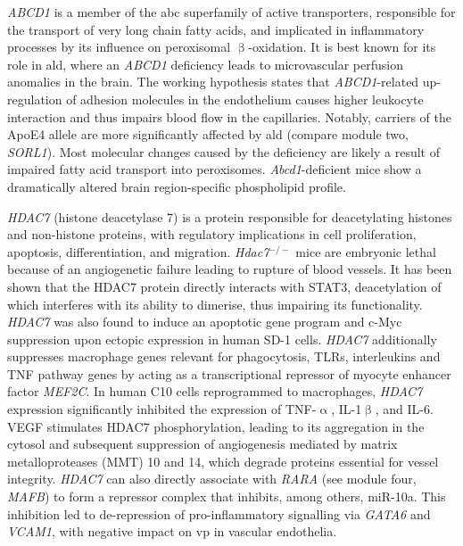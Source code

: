\emph{ABCD1} is a member of the \ac{abc} superfamily of active transporters, responsible for the transport of very long chain fatty acids, and implicated in inflammatory processes by its influence on peroxisomal $\upbeta$-oxidation.\cite{Hama2018} It is best known for its role in \ac{ald}, where an \emph{ABCD1} deficiency leads to microvascular perfusion anomalies in the brain.\cite{Lauer2017} The working hypothesis states that \emph{ABCD1}-related up-regulation of adhesion molecules in the endothelium causes higher leukocyte interaction and thus impairs blood flow in the capillaries. Notably, carriers of the ApoE4 allele are more significantly affected by \ac{ald} (compare module two, \emph{SORL1}).\cite{Orchard2019} Most molecular changes caused by the deficiency are likely a result of impaired fatty acid transport into peroxisomes. \emph{Abcd1}-deficient mice show a dramatically altered brain region-specific phospholipid profile.\cite{Hama2018}

\emph{HDAC7} (histone deacetylase 7) is a protein responsible for deacetylating histones and non-histone proteins, with regulatory implications in cell proliferation, apoptosis, differentiation, and migration.\cite{Lei2017} \emph{Hdac7}$^{-/-}$ mice are embryonic lethal because of an angiogenetic failure leading to rupture of blood vessels.\cite{Chang2006} It has been shown that the HDAC7 protein directly interacts with STAT3, deacetylation of which interferes with its ability to dimerise, thus impairing its functionality.\cite{Peixoto2016,Lei2017} \emph{HDAC7} was also found to induce an apoptotic gene program and c-Myc suppression upon ectopic expression in human SD-1 cells.\cite{Barneda-Zahonero2015} \emph{HDAC7} additionally suppresses macrophage genes relevant for phagocytosis, TLRs, interleukins and TNF pathway genes by acting as a transcriptional repressor of myocyte enhancer factor \emph{MEF2C}.\cite{Barneda-Zahonero2013} In human C10 cells reprogrammed to macrophages, \emph{HDAC7} expression significantly inhibited the expression of TNF-$\upalpha$, IL-1$\upbeta$, and IL-6.\cite{Barneda-Zahonero2013} VEGF stimulates HDAC7 phosphorylation, leading to its aggregation in the cytosol and subsequent suppression of angiogenesis mediated by matrix metalloproteases (MMT) 10 and 14, which degrade proteins essential for vessel integrity.\cite{Miano2006,Ha2008} \emph{HDAC7} can also directly associate with \emph{RARA} (see module four, \emph{MAFB}) to form a repressor complex that inhibits, among others, miR-10a.\cite{Lee2017} This inhibition led to de-repression of pro-inflammatory signalling via \emph{GATA6} and \emph{VCAM1}, with negative impact on \ac{vp} in vascular endothelia.
 
